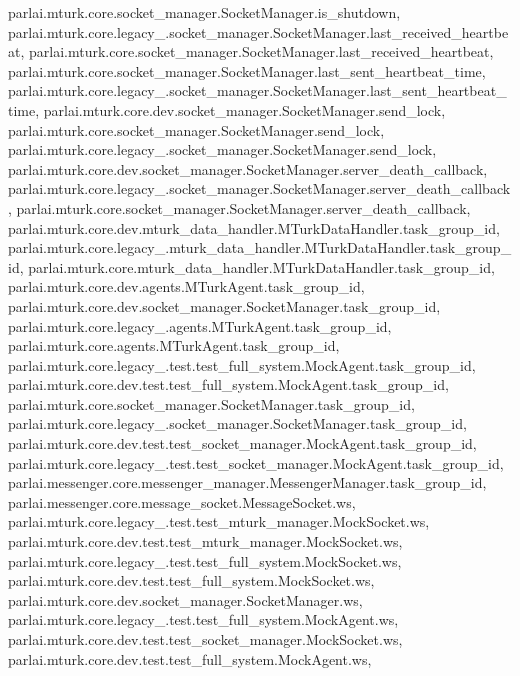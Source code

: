 parlai.\+mturk.\+core.\+socket\+\_\+manager.\+Socket\+Manager.\+is\+\_\+shutdown, parlai.\+mturk.\+core.\+legacy\+\_.\+socket\+\_\+manager.\+Socket\+Manager.\+last\+\_\+received\+\_\+heartbeat, parlai.\+mturk.\+core.\+socket\+\_\+manager.\+Socket\+Manager.\+last\+\_\+received\+\_\+heartbeat, parlai.\+mturk.\+core.\+socket\+\_\+manager.\+Socket\+Manager.\+last\+\_\+sent\+\_\+heartbeat\+\_\+time, parlai.\+mturk.\+core.\+legacy\+\_.\+socket\+\_\+manager.\+Socket\+Manager.\+last\+\_\+sent\+\_\+heartbeat\+\_\+time, parlai.\+mturk.\+core.\+dev.\+socket\+\_\+manager.\+Socket\+Manager.\+send\+\_\+lock, parlai.\+mturk.\+core.\+socket\+\_\+manager.\+Socket\+Manager.\+send\+\_\+lock, parlai.\+mturk.\+core.\+legacy\+\_.\+socket\+\_\+manager.\+Socket\+Manager.\+send\+\_\+lock, parlai.\+mturk.\+core.\+dev.\+socket\+\_\+manager.\+Socket\+Manager.\+server\+\_\+death\+\_\+callback, parlai.\+mturk.\+core.\+legacy\+\_.\+socket\+\_\+manager.\+Socket\+Manager.\+server\+\_\+death\+\_\+callback, parlai.\+mturk.\+core.\+socket\+\_\+manager.\+Socket\+Manager.\+server\+\_\+death\+\_\+callback, parlai.\+mturk.\+core.\+dev.\+mturk\+\_\+data\+\_\+handler.\+M\+Turk\+Data\+Handler.\+task\+\_\+group\+\_\+id, parlai.\+mturk.\+core.\+legacy\+\_.\+mturk\+\_\+data\+\_\+handler.\+M\+Turk\+Data\+Handler.\+task\+\_\+group\+\_\+id, parlai.\+mturk.\+core.\+mturk\+\_\+data\+\_\+handler.\+M\+Turk\+Data\+Handler.\+task\+\_\+group\+\_\+id, parlai.\+mturk.\+core.\+dev.\+agents.\+M\+Turk\+Agent.\+task\+\_\+group\+\_\+id, parlai.\+mturk.\+core.\+dev.\+socket\+\_\+manager.\+Socket\+Manager.\+task\+\_\+group\+\_\+id, parlai.\+mturk.\+core.\+legacy\+\_.\+agents.\+M\+Turk\+Agent.\+task\+\_\+group\+\_\+id, parlai.\+mturk.\+core.\+agents.\+M\+Turk\+Agent.\+task\+\_\+group\+\_\+id, parlai.\+mturk.\+core.\+legacy\+\_.\+test.\+test\+\_\+full\+\_\+system.\+Mock\+Agent.\+task\+\_\+group\+\_\+id, parlai.\+mturk.\+core.\+dev.\+test.\+test\+\_\+full\+\_\+system.\+Mock\+Agent.\+task\+\_\+group\+\_\+id, parlai.\+mturk.\+core.\+socket\+\_\+manager.\+Socket\+Manager.\+task\+\_\+group\+\_\+id, parlai.\+mturk.\+core.\+legacy\+\_.\+socket\+\_\+manager.\+Socket\+Manager.\+task\+\_\+group\+\_\+id, parlai.\+mturk.\+core.\+dev.\+test.\+test\+\_\+socket\+\_\+manager.\+Mock\+Agent.\+task\+\_\+group\+\_\+id, parlai.\+mturk.\+core.\+legacy\+\_.\+test.\+test\+\_\+socket\+\_\+manager.\+Mock\+Agent.\+task\+\_\+group\+\_\+id, parlai.\+messenger.\+core.\+messenger\+\_\+manager.\+Messenger\+Manager.\+task\+\_\+group\+\_\+id, parlai.\+messenger.\+core.\+message\+\_\+socket.\+Message\+Socket.\+ws, parlai.\+mturk.\+core.\+legacy\+\_.\+test.\+test\+\_\+mturk\+\_\+manager.\+Mock\+Socket.\+ws, parlai.\+mturk.\+core.\+dev.\+test.\+test\+\_\+mturk\+\_\+manager.\+Mock\+Socket.\+ws, parlai.\+mturk.\+core.\+legacy\+\_.\+test.\+test\+\_\+full\+\_\+system.\+Mock\+Socket.\+ws, parlai.\+mturk.\+core.\+dev.\+test.\+test\+\_\+full\+\_\+system.\+Mock\+Socket.\+ws, parlai.\+mturk.\+core.\+dev.\+socket\+\_\+manager.\+Socket\+Manager.\+ws, parlai.\+mturk.\+core.\+legacy\+\_.\+test.\+test\+\_\+full\+\_\+system.\+Mock\+Agent.\+ws, parlai.\+mturk.\+core.\+dev.\+test.\+test\+\_\+socket\+\_\+manager.\+Mock\+Socket.\+ws, parlai.\+mturk.\+core.\+dev.\+test.\+test\+\_\+full\+\_\+system.\+Mock\+Agent.\+ws, 